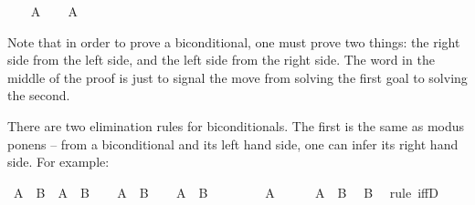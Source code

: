 \begin{isabellebody}
\isanewline
\ \ \isamarkupfalse%
\ {\isachardoublequoteopen}A{\isachardoublequoteclose}\isanewline
\ \ \isamarkupfalse%
\ {\isachardoublequoteopen}A{\isachardoublequoteclose}\isacommand{{\isachardot}}\isamarkupfalse%
\isanewline
{}\isamarkupfalse%
%
\endisatagproof
{\isafoldproof}%
%
\isadelimproof
%
\endisadelimproof
%
\begin{isamarkuptext}%
Note that in order to prove a biconditional, one must prove two things: the right side from 
the left side, and the left side from the right side. The word  in the middle of the
proof is just to signal the move from solving the first goal to solving the second.%
\end{isamarkuptext}\isamarkuptrue%
%
\isadelimdocument
%
\endisadelimdocument
%
\isatagdocument
%
\isamarkuptrue%
%
\endisatagdocument
{\isafolddocument}%
%
\isadelimdocument
%
\endisadelimdocument
%
\begin{isamarkuptext}%
There are two elimination rules for biconditionals. The first is the same as modus ponens --
from a biconditional and its left hand side, one can infer its right hand side. For example:%
\end{isamarkuptext}\isamarkuptrue%
\isamarkupfalse%
\ {\isachardoublequoteopen}{\isacharparenleft}A\ {\isasymlongleftrightarrow}\ B{\isacharparenright}\ {\isasymlongrightarrow}\ A\ {\isasymlongrightarrow}\ B{\isachardoublequoteclose}\isanewline
%
\isadelimproof
%
\endisadelimproof
%
\isatagproof
{}\isamarkupfalse%
\isanewline
\ \ \isamarkupfalse%
\ {\isachardoublequoteopen}A\ {\isasymlongleftrightarrow}\ B{\isachardoublequoteclose}\isanewline
\ \ \isamarkupfalse%
\ {\isachardoublequoteopen}A\ {\isasymlongrightarrow}\ B{\isachardoublequoteclose}\isanewline
\ \ \isamarkupfalse%
\isanewline
\ \ \ \ \isamarkupfalse%
\ {\isachardoublequoteopen}A{\isachardoublequoteclose}\isanewline
\ \ \ \ \isamarkupfalse%
\ {\isacharbackquoteopen}A\ {\isasymlongleftrightarrow}\ B{\isacharbackquoteclose}\ \isamarkupfalse%
\ {\isachardoublequoteopen}B{\isachardoublequoteclose}\ \isamarkupfalse%
\ {\isacharparenleft}rule\ iffD{}{\isacharparenright}\isanewline
\ \ \isamarkupfalse%
\isanewline
{}\isamarkupfalse%
%
\endisatagproof
{\isafoldproof}%
%
\isadelimproof
%
\endisadelimproof
%
\begin{isamarkuptext}%

\end{isamarkuptext}
\end{isabellebody}
